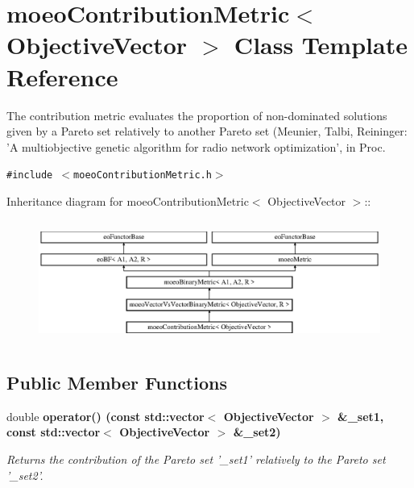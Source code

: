 \section{moeo\-Contribution\-Metric$<$ Objective\-Vector $>$ Class Template Reference}
\label{classmoeoContributionMetric}
The contribution metric evaluates the proportion of non-dominated solutions given by a Pareto set relatively to another Pareto set (Meunier, Talbi, Reininger: 'A multiobjective genetic algorithm for radio network optimization', in Proc.  


{\tt \#include $<$moeo\-Contribution\-Metric.h$>$}

Inheritance diagram for moeo\-Contribution\-Metric$<$ Objective\-Vector $>$::\begin{figure}[H]
\begin{center}
\leavevmode
\includegraphics[height=4.03458cm]{classmoeoContributionMetric}
\end{center}
\end{figure}
\subsection*{Public Member Functions}
\begin{CompactItemize}
\item 
double \bf{operator()} (const std::vector$<$ \bf{Objective\-Vector} $>$ \&\_\-set1, const std::vector$<$ \bf{Objective\-Vector} $>$ \&\_\-set2)
\begin{CompactList}\small\item\em Returns the contribution of the Pareto set '\_\-set1' relatively to the Pareto set '\_\-set2'. \item\end{CompactList}\end{CompactItemize}

